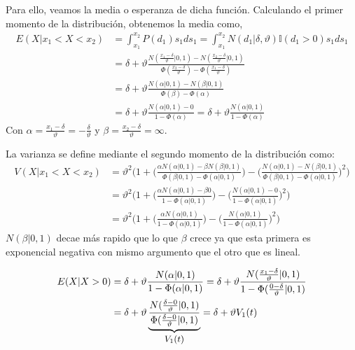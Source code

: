 \documentclass[11pt,twoside,spanish]{report} %
\begin{document}
Para ello, veamos la media o esperanza de dicha funci\'on.
Calculando el primer momento de la distribuci\'on, obtenemos la media como,
\begin{equation}\label{eq:mean_aprox_double}
	\begin{split}
		E(X| x_1 < X < x_2) &=  \int_{x_1}^{x_2} P(d_1)s_1ds_1 = \int_{x_1}^{x_2}  N(d_1|\delta,\vartheta) \mathbb{I}(d_1 > 0)s_1ds_1 \\
		&= \delta + \vartheta \frac{N(\frac{x_1-\delta}{\vartheta}|0,1) - N(\frac{x_2-\delta}{\vartheta}|0,1) }{\Phi(\frac{x_2-\delta}{\vartheta}) - \Phi(\frac{x_1-\delta}{\vartheta}) } \\
		&= \delta +\vartheta \frac{N(\alpha|0,1) - N(\beta|0,1) }{\Phi(\beta) - \Phi(\alpha) }\\
		& = \delta + \vartheta \frac{N(\alpha|0,1) - 0 }{1 - \Phi(\alpha) } = \delta + \vartheta \frac{N(\alpha|0,1)}{1 - \Phi(\alpha) }
	\end{split}
\end{equation}
Con $\alpha=\frac{x_1-\delta}{\vartheta}=-\frac{\delta}{\vartheta}$ y $\beta=\frac{x_2-\delta}{\vartheta}=\infty$.

La varianza se define mediante el segundo momento de la distribuci\'on como:
\begin{equation}\label{eq:variance_aprox_double}
	\begin{split}
		V(X| x_1 < X < x_2) &= \vartheta^2 \Bigg( 1 + \bigg(\frac{\alpha N(\alpha|0,1) - \beta N(\beta|0,1) }{\Phi(\beta|0,1) - \Phi(\alpha|0,1) }\bigg) - \bigg(\frac{N(\alpha|0,1) - N(\beta|0,1) }{\Phi(\beta|0,1) - \Phi(\alpha|0,1) }\bigg)^2 \Bigg)\\
		&=\vartheta^2 \Bigg( 1 + \bigg(\frac{\alpha N(\alpha|0,1) - \beta 0 }{1 - \Phi(\alpha|0,1) }\bigg) - \bigg(\frac{N(\alpha|0,1) - 0 }{1 - \Phi(\alpha|0,1) }\bigg)^2 \Bigg)\\
		&=\vartheta^2 \Bigg( 1 + \bigg(\frac{\alpha N(\alpha|0,1)}{1 - \Phi(\alpha|0,1) }\bigg) - \bigg(\frac{N(\alpha|0,1) }{1 - \Phi(\alpha|0,1) }\bigg)^2 \Bigg)
	\end{split}
\end{equation}
$N(\beta|0,1)$ decae m\'as rapido que lo que $\beta$ crece ya que esta primera es exponencial negativa con mismo argumento que el otro que es lineal.



\begin{equation}\label{eq:mean_aprox_}
	\begin{split}
		E(X|  X > 0)  &= \delta + \vartheta \frac{N(\alpha|0,1)}{1 - \Phi(\alpha|0,1) } = \delta + \vartheta \frac{N(\frac{x_1-\delta}{\vartheta}|0,1)}{1 - \Phi(\frac{0-\delta}{\vartheta}|0,1) }\\
		& = \delta + \vartheta \underbrace{\frac{N(\frac{\delta-0}{\vartheta}|0,1)}{\Phi(\frac{\delta-0}{\vartheta}|0,1) }}_{\text{\small $V_1(t)$} } = \delta + \vartheta V_1(t)
	\end{split}
\end{equation}
\end{document}
